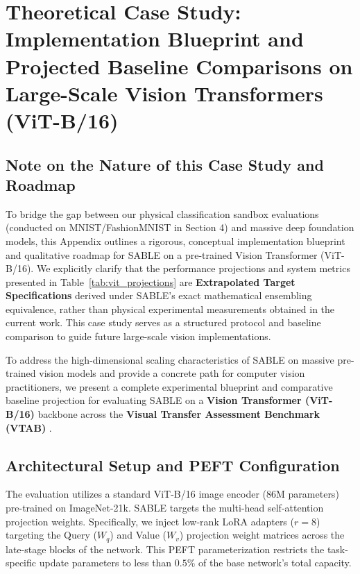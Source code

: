 \documentclass{article}
\theoremstyle{plain}
\theoremstyle{definition}
\theoremstyle{remark}
\begin{document}










\newpage
\appendix
\onecolumn

\section{Theoretical Case Study: Implementation Blueprint and Projected Baseline Comparisons on Large-Scale Vision Transformers (ViT-B/16)}
\label{app:vit_blueprint}

\subsection*{Note on the Nature of this Case Study and Roadmap}
To bridge the gap between our physical classification sandbox evaluations (conducted on MNIST/FashionMNIST in Section 4) and massive deep foundation models, this Appendix outlines a rigorous, conceptual implementation blueprint and qualitative roadmap for SABLE on a pre-trained Vision Transformer (ViT-B/16). We explicitly clarify that the performance projections and system metrics presented in Table~\ref{tab:vit_projections} are \textbf{Extrapolated Target Specifications} derived under SABLE's exact mathematical ensembling equivalence, rather than physical experimental measurements obtained in the current work. This case study serves as a structured protocol and baseline comparison to guide future large-scale vision implementations.

To address the high-dimensional scaling characteristics of SABLE on massive pre-trained vision models and provide a concrete path for computer vision practitioners, we present a complete experimental blueprint and comparative baseline projection for evaluating SABLE on a \textbf{Vision Transformer (ViT-B/16)} backbone across the \textbf{Visual Transfer Assessment Benchmark (VTAB)} \cite{vtab}.

\subsection{Architectural Setup and PEFT Configuration}
The evaluation utilizes a standard ViT-B/16 image encoder (86M parameters) pre-trained on ImageNet-21k. SABLE targets the multi-head self-attention projection weights. Specifically, we inject low-rank LoRA adapters ($r=8$) targeting the Query ($W_q$) and Value ($W_v$) projection weight matrices across the late-stage blocks of the network. This PEFT parameterization restricts the task-specific update parameters to less than $0.5\%$ of the base network's total capacity.
\end{document}
